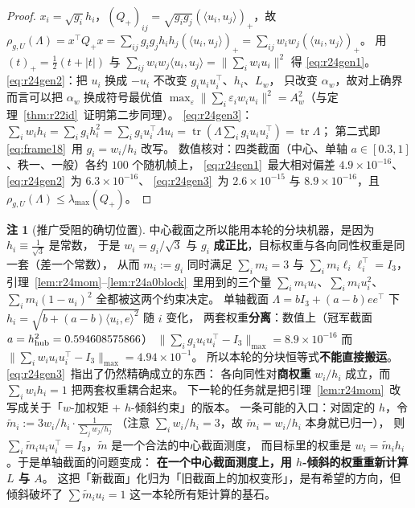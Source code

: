 \documentclass[UTF8,11pt]{ctexart}
\theoremstyle{definition}
\newtheorem{remark}[theorem]{注}
\newcommand{\Lam}{\Lambda}
\newcommand{\tr}{\operatorname{tr}}
\begin{document}
\begin{proof}
$x_i=\sqrt{g_i}h_i$，$(Q_+)_{ij}=\sqrt{g_ig_j}(\langle u_i,u_j\rangle)_+$，故
$\rho_{g,U}(\Lam)=x^\top Q_+x=\sum_{ij}g_ig_jh_ih_j(\langle u_i,u_j\rangle)_+
=\sum_{ij}w_iw_j(\langle u_i,u_j\rangle)_+$。
用 $(t)_+=\frac12(t+|t|)$ 与 $\sum_{ij}w_iw_j\langle u_i,u_j\rangle=\|\sum_iw_iu_i\|^2$ 得
\eqref{eq:r24gen1}。
\eqref{eq:r24gen2}：把 $u_i$ 换成 $-u_i$ 不改变 $g_iu_iu_i^\top$、$h_i$、$L_w$，
只改变 $\alpha_w$，故对上确界而言可以把 $\alpha_w$ 换成符号最优值
$\max_\varepsilon\|\sum_i\varepsilon_iw_iu_i\|^2=A_w^2$（与定理~\ref{thm:r22id}~证明第二步同理）。
\eqref{eq:r24gen3}：$\sum_iw_ih_i=\sum_ig_ih_i^2=\sum_ig_iu_i^\top\Lam u_i=\tr(\Lam\sum_ig_iu_iu_i^\top)=\tr\Lam$；
第二式即 \eqref{eq:frame18}~用 $g_i=w_i/h_i$ 改写。
数值核对：四类截面（中心、单轴 $a\in[0.3,1]$、秩一、一般）各约 $100$ 个随机帧上，
\eqref{eq:r24gen1}~最大相对偏差 $4.9\times10^{-16}$、\eqref{eq:r24gen2}~为 $6.3\times10^{-16}$、
\eqref{eq:r24gen3}~为 $2.6\times10^{-15}$ 与 $8.9\times10^{-16}$，且 $\rho_{g,U}(\Lam)\le\lambda_{\max}(Q_+)$。
\end{proof}

\begin{remark}[推广受阻的确切位置]\label{rem:r24obs}
中心截面之所以能用本轮的分块机器，是因为 $h_i\equiv\frac1{\sqrt3}$ 是常数，
于是 $w_i=g_i/\sqrt3$ 与 $g_i$ \textbf{成正比}，目标权重与各向同性权重是同一套（差一个常数），
从而 $m_i:=g_i$ 同时满足 $\sum_im_i=3$ 与 $\sum_im_i\ell_i\ell_i^\top=I_3$，
引理~\ref{lem:r24mom}--\ref{lem:r24a0block}~里用到的三个量
$\sum_im_iu_i$、$\sum_im_iu_i^2$、$\sum_im_i(1-u_i)^2$ 全都被这两个约束决定。
单轴截面 $\Lam=bI_3+(a-b)ee^\top$ 下 $h_i=\sqrt{b+(a-b)\langle u_i,e\rangle^2}$ 随 $i$ 变化，
两套权重\textbf{分离}：数值上（冠军截面 $a=h_{\rm hub}^2=0.594608575866$）
$\bigl\|\sum_ig_iu_iu_i^\top-I_3\bigr\|_{\max}=8.9\times10^{-16}$ 而
$\bigl\|\sum_iw_iu_iu_i^\top-I_3\bigr\|_{\max}=4.94\times10^{-1}$。
所以本轮的分块恒等式\textbf{不能直接搬运}。
\eqref{eq:r24gen3}~指出了仍然精确成立的东西：
各向同性对\textbf{商权重} $w_i/h_i$ 成立，而 $\sum_iw_ih_i=1$ 把两套权重耦合起来。
下一轮的任务就是把引理~\ref{lem:r24mom}~改写成关于「$w$-加权矩 $+$ $h$-倾斜约束」的版本。
一条可能的入口：对固定的 $h$，令 $\tilde m_i:=3w_i/h_i\cdot\frac1{\sum_jw_j/h_j}$
（注意 $\sum_iw_i/h_i=3$，故 $\tilde m_i=w_i/h_i$ 本身就已归一），
则 $\sum_i\tilde m_iu_iu_i^\top=I_3$，$\tilde m$ 是一个合法的中心截面测度，
而目标里的权重是 $w_i=\tilde m_ih_i$。于是单轴截面的问题变成：
\textbf{在一个中心截面测度上，用 $h$-倾斜的权重重新计算 $L$ 与 $A$}。
这把「新截面」化归为「旧截面上的加权变形」，是有希望的方向，但倾斜破坏了
$\sum\tilde m_iu_i=1$ 这一本轮所有矩计算的基石。
\end{remark}
\end{document}
